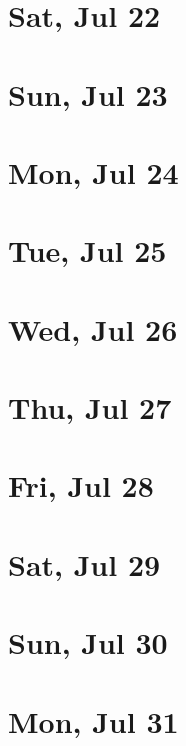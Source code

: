 	\section{Sat, Jul 22}
		
	\section{Sun, Jul 23}
		
	\section{Mon, Jul 24}
		
	\section{Tue, Jul 25}
		
	\section{Wed, Jul 26}
		
	\section{Thu, Jul 27}
		
	\section{Fri, Jul 28}
		
	\section{Sat, Jul 29}
		
	\section{Sun, Jul 30}
		
	\section{Mon, Jul 31}
		
